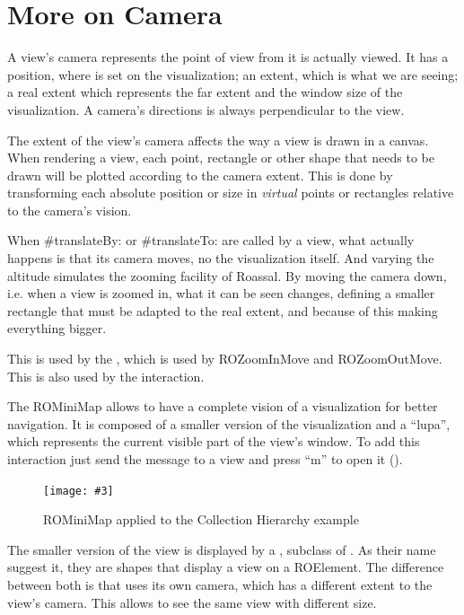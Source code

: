 \documentclass[a4paper,10pt,twoside]{book}
\newcommand{\fig}[4]{
		\begin{figure}[#1]
			\centering
			\texttt{[image: \#3]}
			\caption{\label{fig:#3}#4}
		\end{figure}}
\begin{document}



\section{More on Camera} 

A view's camera represents the point of view from it is actually viewed. It has a position, where is set on the visualization; an extent, which is what we are seeing; a real extent which represents the far extent and the window size of the visualization. A camera's directions is always perpendicular to the view.

The extent of the view's camera affects the way a view is drawn in a canvas. When rendering a view, each point, rectangle or other shape that needs to be drawn will be plotted according to the camera extent. This is done by transforming each absolute position or size in \emph{virtual} points or rectangles relative to the camera's vision.

When \#translateBy: or \#translateTo: are called by a view, what actually happens is that its camera moves, no the visualization itself. 
And varying the altitude simulates the zooming facility of Roassal. By moving the camera down, i.e. when a view is zoomed in, what it can be seen changes, defining a smaller rectangle that must be adapted to the real extent, and because of this making everything bigger.%

This is used by the , which is used by ROZoomInMove and ROZoomOutMove. This is also used by the  interaction.

The ROMiniMap allows to have a complete vision of a visualization for better navigation. It is composed of a smaller version of the visualization and a ``lupa'', which represents the current visible part of the view's window. To add this interaction just send the  message to a view and press ``m'' to open it ().

\fig{H}{0.9}{miniMap}{ROMiniMap applied to the Collection Hierarchy example}

The smaller version of the view is displayed by a , subclass of . 
As their name suggest it, they are shapes that display a view on a ROElement. The difference between both is that  uses its own camera, which has a different extent to the view's camera. This allows  to see the same view with different size. 
\end{document}
